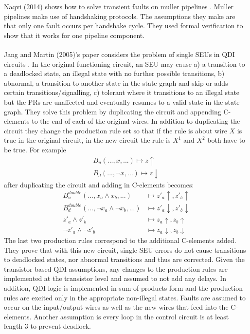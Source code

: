 \documentclass[12pt]{report}
\begin{document}
Naqvi (2014) shows how to solve transient faults on muller pipelines \cite{Naqvi_mullerpipeline}. Muller pipelines make use of handshaking protocols. The assumptions they make are that only one fault occurs per handshake cycle. They used formal verification to show that it works for one pipeline component. \\
\\
Jang and Martin (2005)’s paper considers the problem of single SEUs in QDI circuits \cite{JangMartin_SEUQDI}. In the original functioning circuit, an SEU may cause a) a transition to a deadlocked state, an illegal state with no further possible transitions, b) abnormal, a transition to another state in the state graph and skip or adds certain transitions/signalling, c) tolerant where it transitions to an illegal state but the PRs are unaffected and eventually resumes to a valid state in the state graph. They solve this problem by duplicating the circuit and appending C-elements to the end of each of the original wires. In addition to duplicating the circuit they change the production rule set so that if the rule is about wire $X$ is true in the original circuit, in the new circuit the rule is $X^1$ and $X^2$ both have to be true. For example
\begin{align*}
B_u (...,x,...)\mapsto z\uparrow \\
B_d (...,\lnot x,...)\mapsto z\downarrow
\end{align*}
after duplicating the circuit and adding in C-elements becomes:
\begin{align*}
B_u^{double} (...,x_a\wedge x_b,...) & \mapsto z'_a\uparrow, z'_b\uparrow\\
B_d^{double} (...,\lnot x_a\wedge \lnot x_b,...) & \mapsto z'_a\downarrow, z'_b\downarrow\\
z'_a \wedge z'_b& \mapsto z_a\uparrow, z_b\uparrow\\
\lnot z'_a\wedge \lnot z'_b& \mapsto z_a\downarrow, z_b\downarrow
\end{align*}
The last two production rules correspond to the additional C-elements added. 
They prove that with this new circuit, single SEU errors do not cause transitions to deadlocked states, nor abnormal transitions and thus are corrected. Given the transistor-based QDI assumptions, any changes to the production rules are implemented at the transistor level and assumed to not add any delays. In addition, QDI logic is implemented in sum-of-products form and the production rules are excited only in the appropriate non-illegal states. Faults are assumed to occur on the input/output wires as well as the new wires that feed into the C-elements. Another assumption is every loop in the control circuit is at least length 3 to prevent deadlock. %
\\
\end{document}
